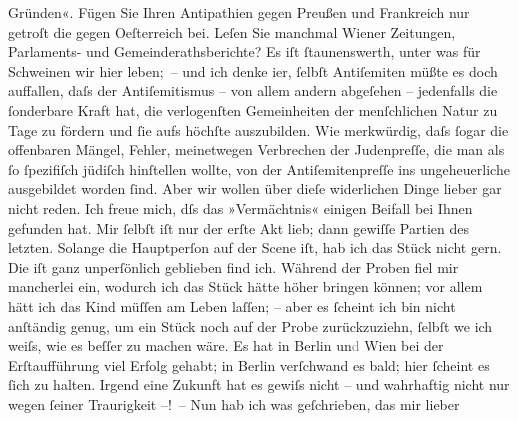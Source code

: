 \begin{ledgroupsized}[t]{13cm}
                    Gründen«. Fügen Sie Ihren Antipathien gegen Preußen und Frankreich nur getroſt \introOben{}die\introOben{} gegen Oeſterreich bei. Leſen Sie manchmal Wiener Zeitungen, Parlaments- und
                    Gemeinderathsberichte? Es iſt ſtaunenswerth, unter was für Schweinen wir hier
                    leben; – und {\pb}ich denke i{\geminationm}er, ſelbſt Antiſemiten müßte es doch auffallen,
                    daſs der Antiſemitismus – von allem andern abgeſehen – jedenfalls die ſonderbare
                    Kraft hat, die verlogenſten Gemeinheiten der menſchlichen Natur zu Tage zu
                    fördern und ſie aufs höchſte auszubilden. Wie merkwürdig, daſs ſogar die
                    offenbaren Mängel, Fehler, meinetwegen Verbrechen der Judenpreſſe, die man als
                    ſo ſpezifiſch jüdiſch hinſtellen wollte, von der Antiſemiten{\pb}preſſe ins ungeheuerliche ausgebildet worden
                    ſind. Aber wir wollen über dieſe widerlichen Dinge lieber gar nicht reden.\pend
           \pstart
           Ich freue mich, dſs das »Vermächtnis« einigen
                    Beifall bei Ihnen gefunden hat. Mir ſelbſt iſt nur der erſte Akt lieb; dann
                    gewiſſe Partien des letzten. Solange die Hauptperſon auf der Scene iſt, hab ich
                    das Stück nicht gern. Die iſt ganz unperſönlich geblieben find ich. Während der
                    Proben fiel mir mancherlei ein, wodurch ich das Stück hätte höher bringen
                    können; vor allem hätt ich das Kind {\pb}müſſen
                    am Leben laſſen; – aber es ſcheint ich bin nicht anſtändig genug, um ein Stück
                    noch auf der Probe zurückzuziehn, ſelbſt we{\geminationn} ich
                    weiſs, wie es beſſer zu machen wäre. Es hat in Berlin un\textcolor{gray}{d}{ }Wien bei der Erſtaufführung viel Erfolg gehabt;
                    in Berlin verſchwand es bald; hier ſcheint es
                    ſich zu halten. Irgend eine Zukunft hat es gewiſs nicht – und wahrhaftig nicht
                    nur wegen ſeiner Traurigkeit –! – Nun hab ich was geſchrieben, das mir lieber

\end{ledgroupsized}
